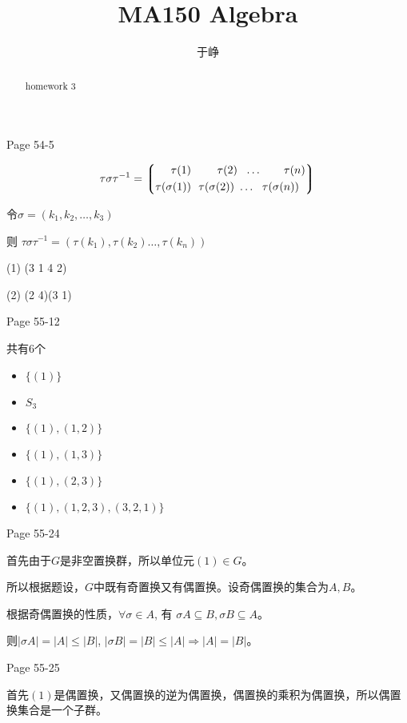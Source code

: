 \documentclass{ximera}
\title{MA150 Algebra}
\author{于峥}
\begin{document}
\begin{abstract}
    homework 3
\end{abstract}
\maketitle

\begin{problem} Page 54-5
    \begin{solution}
        $$    
            \tau\sigma\tau^{-1}=
            \left\lgroup
            \begin{aligned}
                \tau(1)~~&~~~~~\tau(2)~~\dots~~~~~~\tau(n) \\
                \tau(\sigma(1))~~&\tau(\sigma(2))~\dots~~\tau(\sigma(n)) \\
            \end{aligned}
            \right\rgroup
        $$
        
        令$\sigma=(k_1,k_2,\dots,k_3)$

        则 $\tau\sigma\tau^{-1}= (\tau(k_1),\tau(k_2)\dots,\tau(k_n))$

        (1) (3 1 4 2)

        (2) (2 4)(3 1)
    \end{solution}
\end{problem}

\begin{problem} Page 55-12
    \begin{solution} 共有6个
        \begin{itemize}
            \item $\{(1)\}$
            \item $S_3$
            \item $\{(1), (1,2)\}$
            \item $\{(1), (1,3)\}$
            \item $\{(1), (2,3)\}$
            \item $\{(1), (1,2,3),(3,2,1)\}$
        \end{itemize}
    \end{solution}
\end{problem}

\begin{problem} Page 55-24
    \begin{solution}
        首先由于$G$是非空置换群，所以单位元$(1) \in G$。
        
        所以根据题设，$G$中既有奇置换又有偶置换。设奇偶置换的集合为$A, B$。

        根据奇偶置换的性质，$\forall \sigma \in A$, 有 $\sigma A \subseteq B, \sigma B \subseteq A$。

        则$|\sigma A| = |A| \leq |B|$, $|\sigma B| = |B| \leq |A| \Rightarrow |A| = |B|$。
    \end{solution}
\end{problem}

\begin{problem} Page 55-25
    \begin{solution}
        首先$(1)$是偶置换，又偶置换的逆为偶置换，偶置换的乘积为偶置换，所以偶置换集合是一个子群。
    \end{solution}
\end{problem}
\end{document}
